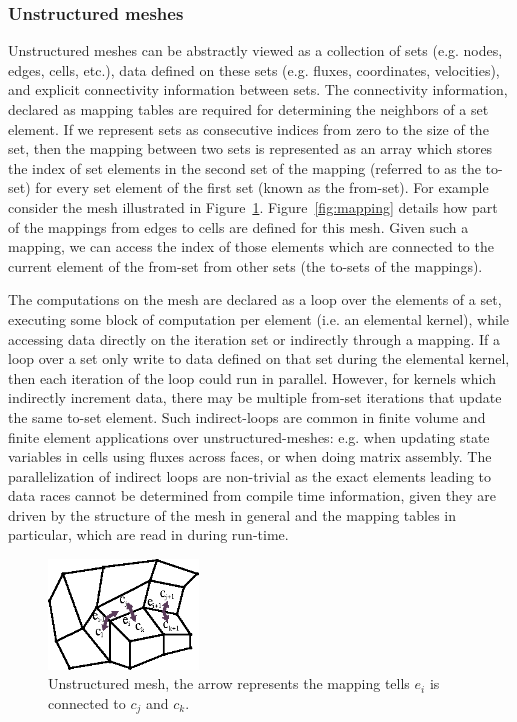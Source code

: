 \subsubsection{Unstructured meshes}\label{unstructured-meshes}

\noindent Unstructured meshes can be abstractly viewed as a collection of sets 
(e.g. nodes, edges, cells, etc.), data defined on these sets (e.g. fluxes, 
coordinates, velocities), and explicit connectivity information between 
sets. The connectivity information, declared as mapping tables are required for 
determining the neighbors of a set element. If we represent sets as consecutive 
indices from zero to the size of the set, then the mapping between two 
sets is represented as an array which stores the index of set elements in the 
second set of the mapping (referred to as the to-set) for every set element of 
the first set (known as the from-set). For example consider the mesh illustrated 
in Figure~\ref{fig:unstructured}. Figure~\ref{fig:mapping} details how part of 
the mappings from edges to cells are defined for this mesh. Given such a 
mapping, we can access the index of those elements which are connected to the 
current element of the from-set from other sets (the to-sets of the mappings). 

The computations on the mesh are declared as a loop over the elements of a set, 
executing some block of computation per element (i.e. an elemental kernel), 
while accessing data directly on the iteration set or indirectly through a 
mapping.  If a loop over a set only write to data defined on that set during the 
elemental kernel, then each iteration of the loop could run in parallel. 
However, for kernels which indirectly increment data, there may be multiple 
from-set iterations that update the same to-set element. Such indirect-loops are 
common in finite volume and finite element applications over 
unstructured-meshes: e.g. when updating state variables in cells using fluxes 
across faces, or when doing matrix assembly. The parallelization of indirect 
loops are non-trivial as the exact elements leading to data races cannot be 
determined from compile time information, given they are driven by the 
structure of the mesh in general and the mapping tables in particular, which are 
read in during run-time. 



\begin{figure}
\centering
\includegraphics[width=4cm]{fig/svg/unstructured.eps}
\caption{Unstructured mesh, the arrow represents the mapping tells $e_i$ is
  connected to $c_j$ and $c_k$.}
\label{fig:unstructured}
\end{figure}



